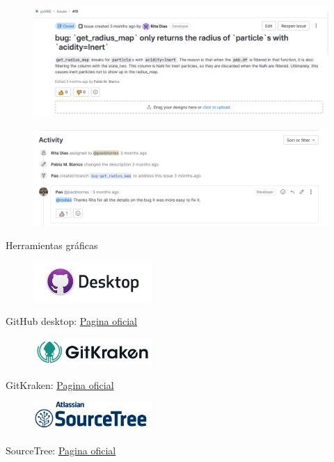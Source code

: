 \documentclass{beamer}
\begin{document}
\begin{frame}
  \begin{figure}
    \includegraphics[width=\textwidth]{images/issue.PNG}
  \end{figure}

  \begin{figure}
    \includegraphics[width=\textwidth]{images/issue-activity.PNG}
  \end{figure}

\end{frame}

\begin{frame} {Herramientas gráficas }
\centering 
    \begin{figure}
      \includegraphics[width=0.4\textwidth]{images/github-desktop.jpg}
    \end{figure}
    GitHub desktop: \href{https://desktop.github.com/}{Pagina oficial}

    \begin{figure}
      \includegraphics[width=0.4\textwidth]{images/gitkraken.jpg}
    \end{figure}
    GitKraken: \href{https://www.gitkraken.com/}{Pagina oficial}

    \begin{figure}
      \includegraphics[width=0.4\textwidth]{images/sourcetree.png}
    \end{figure}

    SourceTree: \href{https://www.sourcetreeapp.com/}{Pagina oficial}


\end{frame}
\end{document}

